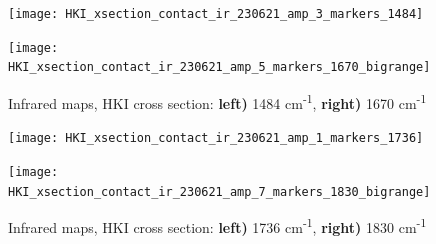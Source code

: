 \begin{figure}[H]
\centering
\begin{minipage}{.45\textwidth}
  \centering
  \texttt{[image: HKI\_xsection\_contact\_ir\_230621\_amp\_3\_markers\_1484]}
\end{minipage}
\begin{minipage}{.45\textwidth}
  \centering
  \texttt{[image: HKI\_xsection\_contact\_ir\_230621\_amp\_5\_markers\_1670\_bigrange]}
\end{minipage}
\caption[Infrared maps, HKI cross section]{Infrared maps, HKI cross section: \textbf{left)} 1484 cm\textsuperscript{-1}, \textbf{right)} 1670 cm\textsuperscript{-1}}
\label{fig:afm_xsection_irmaps_1484_1670}
\end{figure}

\begin{figure}[H]
\centering
\begin{minipage}{.45\textwidth}
  \centering
  \texttt{[image: HKI\_xsection\_contact\_ir\_230621\_amp\_1\_markers\_1736]}
\end{minipage}
\begin{minipage}{.45\textwidth}
  \centering
  \texttt{[image: HKI\_xsection\_contact\_ir\_230621\_amp\_7\_markers\_1830\_bigrange]}
\end{minipage}
\caption[Infrared maps, HKI cross section]{Infrared maps, HKI cross section: \textbf{left)} 1736 cm\textsuperscript{-1}, \textbf{right)} 1830 cm\textsuperscript{-1}}
\label{fig:afm_xsection_irmaps_1736_1830}
\end{figure}















